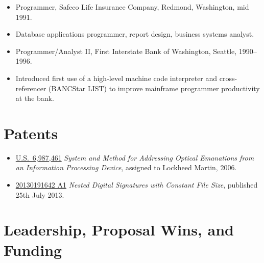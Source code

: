\documentclass[12pt,letterpaper]{article}
\newenvironment{myquote}{\list{}{\leftmargin=0.25in\rightmargin=0in}\item[]}{\endlist}
\begin{document}
\begin{itemize}
\vspace{-2.5mm}
	\item Programmer, Safeco Life Insurance Company, Redmond, Washington, mid 1991.
		\vspace{-2mm}
		\begin{myquote}
			Database applications programmer, report design, business systems analyst.
		\end{myquote}

\vspace{-2.5mm}
	\item Programmer/Analyst II, First Interstate Bank of Washington, Seattle, 1990--1996.
		\vspace{-2mm}
		\begin{myquote}
			Introduced first use of a high-level machine code interpreter and cross-referencer
			(BANCStar LIST) to improve mainframe programmer productivity at the bank.
		\end{myquote}
\end{itemize}

\vspace{-8mm}
\section*{Patents}

\vspace{-2mm}
\begin{itemize}
    \item \href{http://www.google.com/patents/US6987461}{U.S.\ 6,987,461} \emph{System and Method
		for Addressing Optical Emanations from an Information Processing Device}, assigned to
		Lockheed Martin, 2006.

	\vspace{-2mm}
	\item \href{http://appft.uspto.gov/netacgi/nph-Parser?Sect1=PTO1&Sect2=HITOFF&d=PG01&p=1&u=%2Fnetahtml%2FPTO%2Fsrchnum.html&r=1&f=G&l=50&s1=%2220130191642%22.PGNR.&OS=DN/20130191642&RS=DN/20130191642}{20130191642 A1} \emph{Nested Digital Signatures with Constant File Size}, published 25th July 2013.
\end{itemize}

\vspace{-8mm}
\section*{Leadership, Proposal Wins, and Funding}
\end{document}

